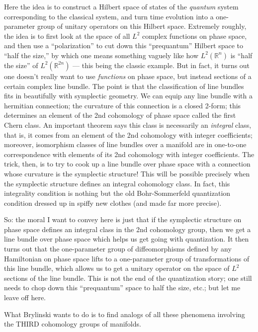 \documentclass{article}
\begin{document}
Here the idea is to construct a Hilbert space of states of the
\emph{quantum} system corresponding to the classical system, and turn
time evolution into a one-parameter group of unitary operators on this
Hilbert space. Extremely roughly, the idea is to first look at the space
of all \(L^2\) complex functions on phase space, and then use a
``polarization'' to cut down this ``prequantum'' Hilbert space to ``half
the size,'' by which one means something vaguely like how
\(L^2(\mathbb{R}^n)\) is ``half the size'' of \(L^2(\mathbb{R}^{2n})\)
--- this being the classic example. But in fact, it turns out one
doesn't really want to use \emph{functions} on phase space, but instead
sections of a certain complex line bundle. The point is that the
classification of line bundles fits in beautifully with symplectic
geometry. We can equip any line bundle with a hermitian connection; the
curvature of this connection is a closed 2-form; this determines an
element of the 2nd cohomology of phase space called the first Chern
class. An important theorem says this class is necessarily an
\emph{integral} class, that is, it comes from an element of the 2nd
cohomology with integer coefficients; moreover, isomorphism classes of
line bundles over a manifold are in one-to-one correspondence with
elements of its 2nd cohomology with integer coefficients. The trick,
then, is to try to cook up a line bundle over phase space with a
connection whose curvature is the symplectic structure! This will be
possible precisely when the symplectic structure defines an integral
cohomology class. In fact, this integrality condition is nothing but the
old Bohr-Sommerfeld quantization condition dressed up in spiffy new
clothes (and made far more precise).

So: the moral I want to convey here is just that if the symplectic
structure on phase space defines an integral class in the 2nd cohomology
group, then we get a line bundle over phase space which helps us get
going with quantization. It then turns out that the one-parameter group
of diffeomorphisms defined by any Hamiltonian on phase space lifts to a
one-parameter group of transformations of this line bundle, which allows
us to get a unitary operator on the space of \(L^2\) sections of the
line bundle. This is not the end of the quantization story; one still
needs to chop down this ``prequantum'' space to half the size, etc.; but
let me leave off here.

What Brylinski wants to do is to find analogs of all these phenomena
involving the THIRD cohomology groups of manifolds.
\end{document}
